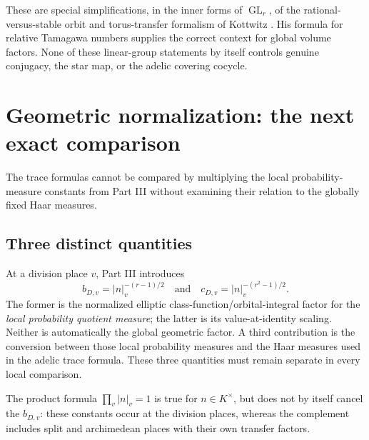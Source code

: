 \documentclass[11pt]{article}
\newcommand{\GL}{\operatorname{GL}}
\theoremstyle{plain}
\theoremstyle{definition}
\begin{document}
These are special simplifications, in the inner forms of $\GL_r$,
of the rational-versus-stable orbit and torus-transfer formalism of
Kottwitz \cite[\S\S7--9]{Kottwitz84}.  His formula for relative
Tamagawa numbers \cite[\S5]{Kottwitz84} supplies the correct context
for global volume factors.  None of these linear-group statements by
itself controls genuine conjugacy, the star map, or the adelic
covering cocycle.

\section{Geometric normalization: the next exact comparison}\label{sec:measures}
The trace formulas cannot be compared by multiplying the local
probability-measure constants from Part III without examining their
relation to the globally fixed Haar measures.

\subsection{Three distinct quantities}
At a division place $v$, Part III introduces
\[
 b_{D,v}=|n|_v^{-(r-1)/2}
 \quad\text{and}\quad
 c_{D,v}=|n|_v^{-(r^2-1)/2}.
\]
The former is the normalized elliptic class-function/orbital-integral
factor for the \emph{local probability quotient measure}; the latter
is its value-at-identity scaling.  Neither is automatically the
global geometric factor.  A third contribution is the conversion
between those local probability measures and the Haar measures used
in the adelic trace formula.  These three quantities must remain
separate in every local comparison.

The product formula $\prod_v|n|_v=1$ is true for $n\in K^\times$,
but does not by itself cancel the $b_{D,v}$: these constants occur
at the division places, whereas the complement includes split and
archimedean places with their own transfer factors.
\end{document}
